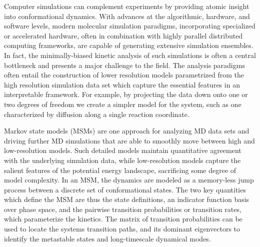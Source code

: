 \documentclass[journal=jpcbfk, layout=twocolumn, manuscript=article]{achemso}
\begin{document}
Computer simulations can complement experiments by providing atomic insight into conformational dynamics. With advances at the algorithmic, hardware, and software levels, modern molecular simulation paradigms, incorporating specialized or accelerated hardware, often in combination with highly parallel distributed computing frameworks, are capable of generating extensive simulation ensembles\cite{Gotz2012Routine, Eastman2013OpenMM, Shirts2000Screen, Shaw2009Millisecond, Hess2008PLINCS, Buch2010High}. In fact, the minimally-biased kinetic analysis of such simulations is often a central bottleneck and presents a major challenge to the field. The analysis paradigms often entail the construction of lower resolution models parametrized from the high resolution simulation data set which capture the essential features in an interpretable framework\cite{Freddolino2010Challenges, Lane2013Milliseconds}. For example, by projecting the data down onto one or two degrees of freedom we create a simpler model for the system, such as one characterized by diffusion along a single reaction coordinate\cite{Best2010Coordinate}.

Markov state models (MSMs) are one approach for analyzing MD data sets and driving further MD simulations that are able to smoothly move between high and low-resolution models\cite{Chodera2007Automatic, Prinz2011Markov, Beauchamp2012Simple, Bowman2013Quantitative}. Such detailed models maintain quantitative agreement with the underlying simulation data, while low-resolution models capture the salient features of the potential energy landscape, sacrificing some degree of model complexity. In an MSM, the dynamics are modeled as a memory-less jump process between a discrete set of conformational states. The two key quantities which define the MSM are thus the state definitions, an indicator function basis over phase space, and the pairwise transition probabilities or transition rates, which parameterize the kinetics. The matrix of transition probabilities can be used to locate the systems transition paths\cite{Weinan2006Towards}, and its dominant eigenvectors to identify the metastable states\cite{Deuflhard2000Identification} and long-timescale dynamical modes\cite{}. 
\end{document}
